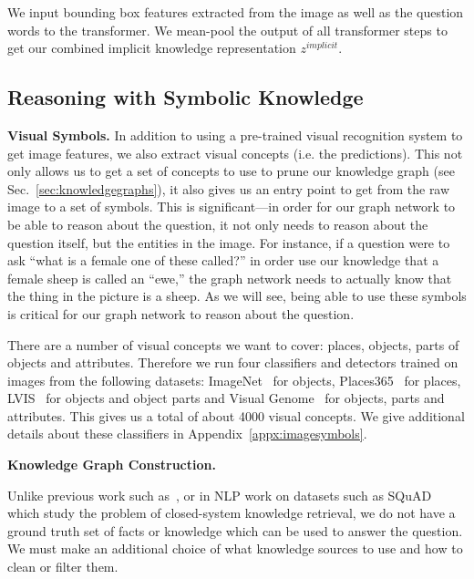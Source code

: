 \documentclass[final]{cvpr}
\providecommand{\myparagraph}[1]{\noindent\textbf{#1.}}
\providecommand{\sectionvspace}{\vspace{-0cm}}
\begin{document}
We input bounding box features extracted from the image as well as the question words to the transformer. We mean-pool the output of all transformer steps to get our combined implicit knowledge representation $z^{implicit}$. 

\sectionvspace
\subsection{Reasoning with Symbolic Knowledge}
\label{sec:model:symbol}
\sectionvspace


\myparagraph{Visual Symbols}
In addition to using a pre-trained visual recognition system to get image features,
we also extract visual concepts (i.e. the predictions). This not only allows us to get a set of concepts to use to prune our knowledge graph (see Sec.~\ref{sec:knowledgegraphs}), it also gives us an entry point to get from the raw image to a set of symbols. This is significant---in order for our graph network to be able to reason about the question, it not only needs to reason about the question itself, but the entities in the image. For instance, if a question were to ask ``what is a female one of these called?'' in order use our knowledge that a female sheep is called an ``ewe,'' the graph network needs to actually know that the thing in the picture is a sheep. As we will see, being able to use these symbols is critical for our graph network to reason about the question.

There are a number of visual concepts we want to cover: places, objects, parts of objects and attributes. Therefore we run four classifiers and detectors trained on images from the following datasets: ImageNet~\cite{ILSVRC15} for objects, Places365~\cite{zhou2017places} for places, LVIS~\cite{gupta2019lvis} for objects and object parts and Visual Genome~\cite{krishnavisualgenome} for objects, parts and attributes. This gives us a total of about 4000 visual concepts. We give additional details about these classifiers in Appendix~\ref{appx:imagesymbols}. 


\myparagraph{Knowledge Graph Construction}
\label{sec:knowledgegraphs}

Unlike previous work such as~\cite{narasimhan2018out}, or in NLP work on datasets such as SQuAD  \cite{rajpurkar16squad} which study the problem of closed-system knowledge retrieval, we do not have a ground truth set of facts or knowledge which can be used to answer the question. We must make an additional choice of what knowledge sources to use and how to clean or filter them.
\end{document}
